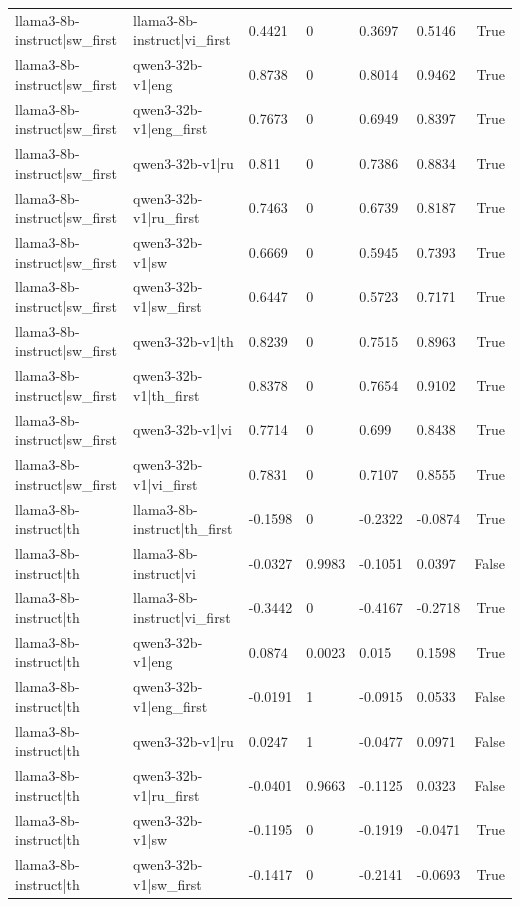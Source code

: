 \begin{table}
\begin{tabular}{llllllr}
llama3-8b-instruct|sw_first & llama3-8b-instruct|vi_first & 0.4421 & 0 & 0.3697 & 0.5146 & True \\
llama3-8b-instruct|sw_first & qwen3-32b-v1|eng & 0.8738 & 0 & 0.8014 & 0.9462 & True \\
llama3-8b-instruct|sw_first & qwen3-32b-v1|eng_first & 0.7673 & 0 & 0.6949 & 0.8397 & True \\
llama3-8b-instruct|sw_first & qwen3-32b-v1|ru & 0.811 & 0 & 0.7386 & 0.8834 & True \\
llama3-8b-instruct|sw_first & qwen3-32b-v1|ru_first & 0.7463 & 0 & 0.6739 & 0.8187 & True \\
llama3-8b-instruct|sw_first & qwen3-32b-v1|sw & 0.6669 & 0 & 0.5945 & 0.7393 & True \\
llama3-8b-instruct|sw_first & qwen3-32b-v1|sw_first & 0.6447 & 0 & 0.5723 & 0.7171 & True \\
llama3-8b-instruct|sw_first & qwen3-32b-v1|th & 0.8239 & 0 & 0.7515 & 0.8963 & True \\
llama3-8b-instruct|sw_first & qwen3-32b-v1|th_first & 0.8378 & 0 & 0.7654 & 0.9102 & True \\
llama3-8b-instruct|sw_first & qwen3-32b-v1|vi & 0.7714 & 0 & 0.699 & 0.8438 & True \\
llama3-8b-instruct|sw_first & qwen3-32b-v1|vi_first & 0.7831 & 0 & 0.7107 & 0.8555 & True \\
llama3-8b-instruct|th & llama3-8b-instruct|th_first & -0.1598 & 0 & -0.2322 & -0.0874 & True \\
llama3-8b-instruct|th & llama3-8b-instruct|vi & -0.0327 & 0.9983 & -0.1051 & 0.0397 & False \\
llama3-8b-instruct|th & llama3-8b-instruct|vi_first & -0.3442 & 0 & -0.4167 & -0.2718 & True \\
llama3-8b-instruct|th & qwen3-32b-v1|eng & 0.0874 & 0.0023 & 0.015 & 0.1598 & True \\
llama3-8b-instruct|th & qwen3-32b-v1|eng_first & -0.0191 & 1 & -0.0915 & 0.0533 & False \\
llama3-8b-instruct|th & qwen3-32b-v1|ru & 0.0247 & 1 & -0.0477 & 0.0971 & False \\
llama3-8b-instruct|th & qwen3-32b-v1|ru_first & -0.0401 & 0.9663 & -0.1125 & 0.0323 & False \\
llama3-8b-instruct|th & qwen3-32b-v1|sw & -0.1195 & 0 & -0.1919 & -0.0471 & True \\
llama3-8b-instruct|th & qwen3-32b-v1|sw_first & -0.1417 & 0 & -0.2141 & -0.0693 & True \\

\end{tabular}
\end{table}
